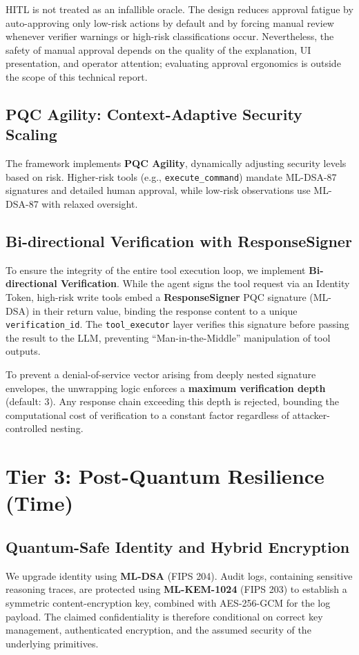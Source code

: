 \documentclass[conference]{IEEEtran}
\begin{document}
HITL is not treated as an infallible oracle. The design reduces approval fatigue by auto-approving only low-risk actions by default and by forcing manual review whenever verifier warnings or high-risk classifications occur. Nevertheless, the safety of manual approval depends on the quality of the explanation, UI presentation, and operator attention; evaluating approval ergonomics is outside the scope of this technical report.

\subsection{PQC Agility: Context-Adaptive Security Scaling}
The framework implements \textbf{PQC Agility}, dynamically adjusting security levels based on risk. Higher-risk tools (e.g., \texttt{execute\_command}) mandate ML-DSA-87 signatures and detailed human approval, while low-risk observations use ML-DSA-87 with relaxed oversight.

\subsection{Bi-directional Verification with ResponseSigner}
To ensure the integrity of the entire tool execution loop, we implement \textbf{Bi-directional Verification}. While the agent signs the tool request via an Identity Token, high-risk write tools embed a \textbf{ResponseSigner} PQC signature (ML-DSA) in their return value, binding the response content to a unique \texttt{verification\_id}. The \texttt{tool\_executor} layer verifies this signature before passing the result to the LLM, preventing ``Man-in-the-Middle'' manipulation of tool outputs.

To prevent a denial-of-service vector arising from deeply nested signature envelopes, the unwrapping logic enforces a \textbf{maximum verification depth} (default: 3). Any response chain exceeding this depth is rejected, bounding the computational cost of verification to a constant factor regardless of attacker-controlled nesting.

\section{Tier 3: Post-Quantum Resilience (Time)}
\subsection{Quantum-Safe Identity and Hybrid Encryption}
We upgrade identity using \textbf{ML-DSA} (FIPS 204). Audit logs, containing sensitive reasoning traces, are protected using \textbf{ML-KEM-1024} (FIPS 203) to establish a symmetric content-encryption key, combined with AES-256-GCM for the log payload. The claimed confidentiality is therefore conditional on correct key management, authenticated encryption, and the assumed security of the underlying primitives.
\end{document}
